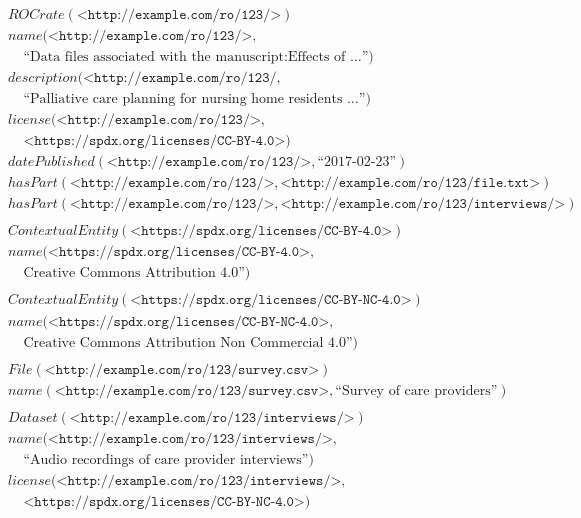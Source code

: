 \allowdisplaybreaks
\begin{eqnarray*}
&& ROCrate(\texttt{<http://example.com/ro/123/>}) \\
&& name(\texttt{<http://example.com/ro/123/>}, \\
&& \ \ \ \ \ \text{“Data files associated with the manuscript:Effects of …”}) \\
&& description(\texttt{<http://example.com/ro/123/}, \\
&& \ \ \ \ \ \text{“Palliative care planning for nursing home residents …”}) \\
&& license(\texttt{<http://example.com/ro/123/>}, \\
&& \ \ \ \ \ \texttt{<https://spdx.org/licenses/CC-BY-4.0>}) \\
&& datePublished(\texttt{<http://example.com/ro/123/>}, \text{“2017-02-23”}) \\
&& hasPart(\texttt{<http://example.com/ro/123/>},
        \texttt{<http://example.com/ro/123/file.txt>}) \\
&& hasPart(\texttt{<http://example.com/ro/123/>},
        \texttt{<http://example.com/ro/123/interviews/>}) \\
\\
&& ContextualEntity(\texttt{<https://spdx.org/licenses/CC-BY-4.0>}) \\
&& name(\texttt{<https://spdx.org/licenses/CC-BY-4.0>},  \\
&& \ \ \ \ \  \text{Creative Commons Attribution 4.0”}) \\
\\
&& ContextualEntity(\texttt{<https://spdx.org/licenses/CC-BY-NC-4.0>}) \\
&& name(\texttt{<https://spdx.org/licenses/CC-BY-NC-4.0>},  \\
&& \ \ \ \ \  \text{Creative Commons Attribution Non Commercial 4.0”}) \\
\\
&& File(\texttt{<http://example.com/ro/123/survey.csv>}) \\
&& name(\texttt{<http://example.com/ro/123/survey.csv>},
        \text{“Survey of care providers”}) \\
\\
&& Dataset(\texttt{<http://example.com/ro/123/interviews/>}) \\
&& name(\texttt{<http://example.com/ro/123/interviews/>},  \\
&& \ \ \ \ \  \text{“Audio recordings of care provider interviews”}) \\
&& license(\texttt{<http://example.com/ro/123/interviews/>}, \\
&& \ \ \ \ \ \texttt{<https://spdx.org/licenses/CC-BY-NC-4.0>})
\end{eqnarray*}


